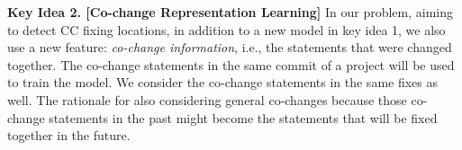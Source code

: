 

{\bf Key Idea 2. [Co-change Representation Learning]} In our problem,
aiming to detect CC fixing locations, in addition to a new model in
key idea 1, we also use a new feature: {\em co-change information},
i.e., the statements that were changed together. The co-change
statements in the same commit of a project will be used to train the
 model. We consider the co-change statements in the same
fixes as well. The rationale for also considering general co-changes
because those co-change statements in the past might become the
statements that will be fixed together in the future.


